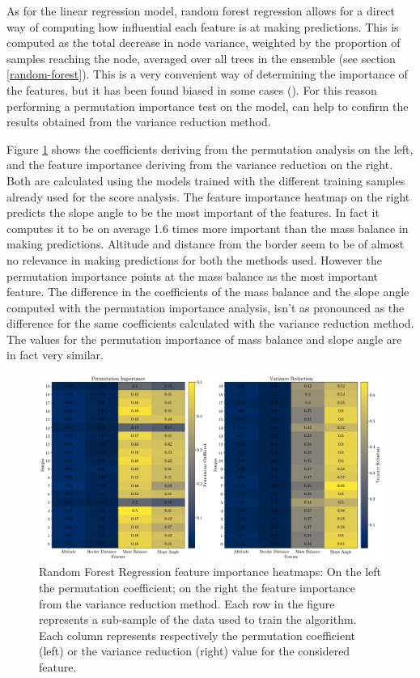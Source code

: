 As for the linear regression model, random forest regression allows for a direct way of computing how influential each feature is at making predictions. This is computed as the total decrease in node variance, weighted by the proportion of samples reaching the node, averaged over all trees in the ensemble (see section \ref{random-forest}). This is a very convenient way of determining the importance of the features, but it has been found biased in some cases (\citet{RandomFBias2007}). For this reason performing a permutation importance test on the model, can help to confirm the results obtained from the variance reduction method. 

Figure \ref{fig:rfr-heatmap} shows the coefficients deriving from the permutation analysis on the left, and the feature importance deriving from the variance reduction on the right. Both are calculated using the models trained with the different training samples already used for the score analysis. The feature importance heatmap on the right predicts the slope angle to be the most important of the features. In fact it computes it to be on average 1.6 times more important than the mass balance in making predictions. Altitude and distance from the border seem to be of almost no relevance in making predictions for both the methods used. However the permutation importance points at the mass balance as the most important feature. The difference in the coefficients of the mass balance and the slope angle computed with the permutation importance analysis, isn't as pronounced as the difference for the same coefficients calculated with the variance reduction method. The values for the permutation importance of mass balance and slope angle are in fact very similar.

\begin{figure}[!tp]
	\centering		  
	\includegraphics[width=1.\textwidth]{figures/RFR_heatmap.pdf}
	\caption{Random Forest Regression feature importance heatmaps: On the left the permutation coefficient; on the right the feature importance from the variance reduction method. Each row in the figure represents a sub-sample of the data used to train the algorithm. Each column represents respectively the permutation coefficient (left) or the variance reduction (right) value for the considered feature.}
	\label{fig:rfr-heatmap}
\end{figure}

